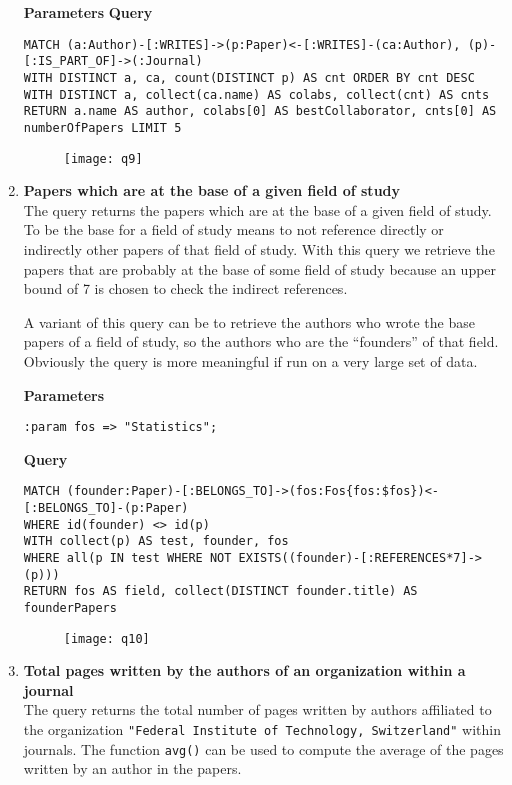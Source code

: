 \begin{enumerate}
    \textbf{Parameters}
    \textbf{Query}
    \begin{lstlisting}[label={lst:lstlisting38}]
MATCH (a:Author)-[:WRITES]->(p:Paper)<-[:WRITES]-(ca:Author), (p)-[:IS_PART_OF]->(:Journal)
WITH DISTINCT a, ca, count(DISTINCT p) AS cnt ORDER BY cnt DESC
WITH DISTINCT a, collect(ca.name) AS colabs, collect(cnt) AS cnts
RETURN a.name AS author, colabs[0] AS bestCollaborator, cnts[0] AS numberOfPapers LIMIT 5
    \end{lstlisting}
    \begin{figure}[H]
        \begin{center}
            \texttt{[image: q9]}
            \label{fig:q9}%
        \end{center}
    \end{figure}
    \item \textbf{Papers which are at the base of a given field of study}\\
    The query returns the papers which are at the base of a given field of study.
    To be the base for a field of study means to not reference directly or indirectly other papers of that field of study.
    With this query we retrieve the papers that are probably at the base of some field of study because an upper bound of 7 is chosen to check the indirect references.

    A variant of this query can be to retrieve the authors who wrote the base papers of a field of study, so the authors who are the ``founders'' of that field.
    Obviously the query is more meaningful if run on a very large set of data.

    \textbf{Parameters}
    \begin{lstlisting}[label={lst:lstlisting39}]
:param fos => "Statistics";
    \end{lstlisting}
    \textbf{Query}
    \begin{lstlisting}[label={lst:lstlisting40}]
MATCH (founder:Paper)-[:BELONGS_TO]->(fos:Fos{fos:$fos})<-[:BELONGS_TO]-(p:Paper)
WHERE id(founder) <> id(p)
WITH collect(p) AS test, founder, fos
WHERE all(p IN test WHERE NOT EXISTS((founder)-[:REFERENCES*7]->(p)))
RETURN fos AS field, collect(DISTINCT founder.title) AS founderPapers
    \end{lstlisting}
    \begin{figure}[H]
        \begin{center}
            \texttt{[image: q10]}
            \label{fig:q10}%
        \end{center}
    \end{figure}
    \item \textbf{Total pages written by the authors of an organization within a journal}\\
    The query returns the total number of pages written by authors affiliated to the organization \verb|"Federal Institute of Technology, Switzerland"| within journals.
    The function \verb|avg()| can be used to compute the average of the pages written by an author in the papers.


\end{enumerate}
